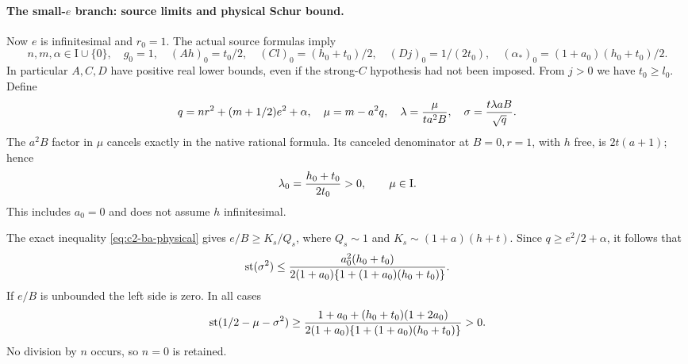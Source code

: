 \paragraph{The small-$e$ branch: source limits and physical Schur bound.}
Now $e$ is infinitesimal and $r_0=1$. The actual source formulas imply
\begin{equation}
 n,m,\alpha\in\mathrm I\cup\{0\},\quad g_0=1,\quad
 (Ah)_0=t_0/2,\quad (Cl)_0=(h_0+t_0)/2,\quad
 (Dj)_0=1/(2t_0),\quad
 (\alpha_*)_0=(1+a_0)(h_0+t_0)/2.
 \label{eq:c2-ba-small-e-products}
\end{equation}
In particular $A,C,D$ have positive real lower bounds, even if the
strong-$C$ hypothesis had not been imposed. From $j>0$ we have $t_0\ge l_0$.
Define
\[
 q=nr^2+(m+1/2)e^2+\alpha,\quad
 \mu=m-a^2q,\quad \lambda={\mu\over ta^2B},\quad
 \sigma={t\lambda aB\over\sqrt q}.
\]
The $a^2B$ factor in $\mu$ cancels exactly in the native rational
formula. Its canceled denominator at $B=0,r=1$, with $h$ free, is
$2t(a+1)$; hence
\begin{equation}
 \lambda_0={h_0+t_0\over2t_0}>0,\qquad \mu\in\mathrm I.
 \label{eq:c2-ba-free-h-lambda}
\end{equation}
This includes $a_0=0$ and does not assume $h$ infinitesimal.

The exact inequality \eqref{eq:c2-ba-physical} gives
$e/B\ge K_s/Q_s$, where $Q_s\sim1$ and
$K_s\sim(1+a)(h+t)$. Since $q\ge e^2/2+\alpha$, it follows that
\begin{equation}
 \operatorname{st}(\sigma^2)
 \le {a_0^2(h_0+t_0)\over
 2(1+a_0)\{1+(1+a_0)(h_0+t_0)\}}.
 \label{eq:c2-ba-free-h-sigma}
\end{equation}
If $e/B$ is unbounded the left side is zero. In all cases
\begin{equation}
 \operatorname{st}(1/2-\mu-\sigma^2)
 \ge {1+a_0+(h_0+t_0)(1+2a_0)\over
 2(1+a_0)\{1+(1+a_0)(h_0+t_0)\}}>0.
 \label{eq:c2-ba-free-h-schur}
\end{equation}
No division by $n$ occurs, so $n=0$ is retained.

